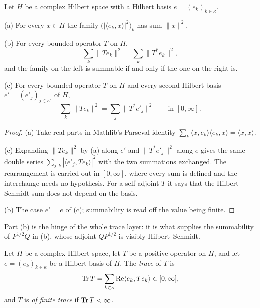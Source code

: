 \begin{lemma}
\label{lem:hilbert-schmidt-adjoint}
\leanok
Let $H$ be a complex Hilbert space with a Hilbert basis $e = (e_k)_{k \in \kappa}$.

(a) For every $x \in H$ the family $\bigl( |\langle e_k, x \rangle|^2 \bigr)_k$ has sum
$\|x\|^2$.

(b) For every bounded operator $T$ on $H$,
\[
  \sum_k \| T e_k \|^2 = \sum_k \| T^* e_k \|^2 ,
\]
and the family on the left is summable if and only if the one on the right is.

(c) For every bounded operator $T$ on $H$ and every second Hilbert basis
$e' = (e'_j)_{j \in \kappa'}$ of $H$,
\[
  \sum_k \| T e_k \|^2 = \sum_j \| T^* e'_j \|^2 \qquad \text{in } [0, \infty] .
\]
\end{lemma}

\begin{proof}
\leanok
(a) Take real parts in Mathlib's Parseval identity
$\sum_k \langle x, e_k \rangle \langle e_k, x \rangle = \langle x, x \rangle$.

(c) Expanding $\|T e_k\|^2$ by (a) along $e'$ and $\|T^* e'_j\|^2$ along $e$ gives the
same double series $\sum_{j,k} |\langle e'_j, T e_k \rangle|^2$ with the two summations
exchanged. The rearrangement is carried out in $[0, \infty]$, where every sum is defined and
the interchange needs no hypothesis. For a self-adjoint $T$ it says that the
Hilbert--Schmidt sum does not depend on the basis.

(b) The case $e' = e$ of (c); summability is read off the value being finite.
\end{proof}

Part (b) is the hinge of the whole trace layer: it is what supplies the summability of
$P^{1/2} Q$ in (b), whose adjoint $Q P^{1/2}$ is visibly
Hilbert--Schmidt.

\begin{definition}
\label{def:trace}
\leanok
{}
Let $H$ be a complex Hilbert space, let $T$ be a positive operator on $H$, and let
$e = (e_k)_{k \in \kappa}$ be a Hilbert basis of $H$. The \emph{trace} of $T$ is
\[
  \operatorname{Tr} T = \sum_{k \in \kappa} \operatorname{Re} \langle e_k, T e_k \rangle \in [0, \infty] ,
\]
and $T$ is \emph{of finite trace} if $\operatorname{Tr} T < \infty$.
\end{definition}

